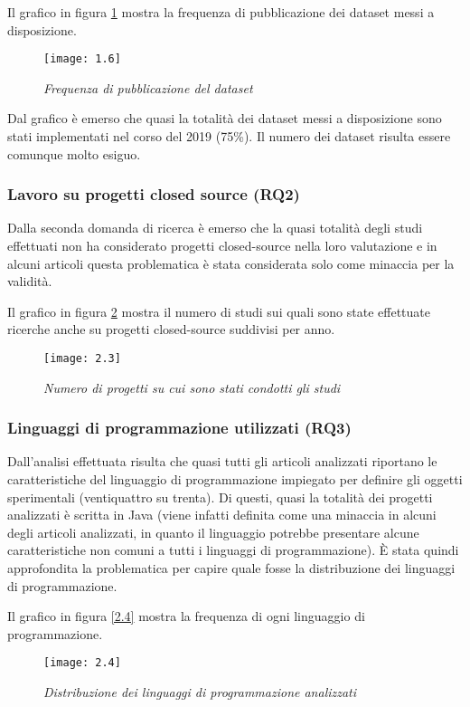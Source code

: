 Il grafico in figura \ref{fig:fig.2.2} mostra la frequenza di pubblicazione dei dataset messi a disposizione.
\begin{figure}[h]
	\centering
	\texttt{[image: 1.6]}
	\caption{\emph{Frequenza di pubblicazione del dataset}}
	\label{fig:fig.2.2}
\end{figure}

Dal grafico è emerso che quasi la totalità dei dataset messi a disposizione
sono stati implementati nel corso del 2019 (75\%). Il numero dei dataset risulta essere comunque molto esiguo.
\subsubsection{Lavoro su progetti closed source (RQ2)}
Dalla seconda domanda di ricerca è emerso che la quasi totalità degli studi effettuati non ha considerato progetti closed-source nella loro valutazione e in alcuni articoli questa problematica è stata considerata solo come minaccia per la validità.

Il grafico in figura \ref{fig:fig2.3} mostra il numero di studi sui quali sono state effettuate ricerche anche su progetti closed-source suddivisi per anno.
\begin{figure}[h]
	\centering
	\texttt{[image: 2.3]}
	\caption{\emph{Numero di progetti su cui sono stati condotti gli studi}}
	\label{fig:fig2.3}
\end{figure}
\subsubsection{Linguaggi di programmazione utilizzati (RQ3)}
Dall'analisi effettuata risulta che quasi tutti gli articoli analizzati riportano le caratteristiche del linguaggio di programmazione impiegato per definire gli oggetti
sperimentali (ventiquattro su trenta). Di questi, quasi la totalità dei progetti
analizzati è scritta in Java (viene infatti definita come una minaccia in alcuni degli
articoli analizzati, in quanto il linguaggio potrebbe presentare alcune caratteristiche
non comuni a tutti i linguaggi di programmazione). È stata quindi approfondita la problematica per capire quale fosse la distribuzione dei linguaggi di programmazione.

Il grafico in figura \ref{2.4} mostra la frequenza di ogni linguaggio di programmazione.
\begin{figure}[h]
	\centering
	\texttt{[image: 2.4]}
	\caption{\emph{Distribuzione dei linguaggi di programmazione analizzati}}
	\label{fig:fig.2.4}
\end{figure}

